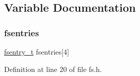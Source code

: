 \subsection{Variable Documentation}
\mbox{\label{a00146_a6b46131164b26e476762930c9aae4319_a6b46131164b26e476762930c9aae4319}} 
\subsubsection{\texorpdfstring{fsentries}{fsentries}}
{\footnotesize\ttfamily \hyperlink{a00146_a9ccf6560e8aebea3e4402a31e8c0f46b_a9ccf6560e8aebea3e4402a31e8c0f46b}{fsentry\+\_\+t} fsentries\mbox{[}4\mbox{]}}



Definition at line 20 of file fs.\+h.


